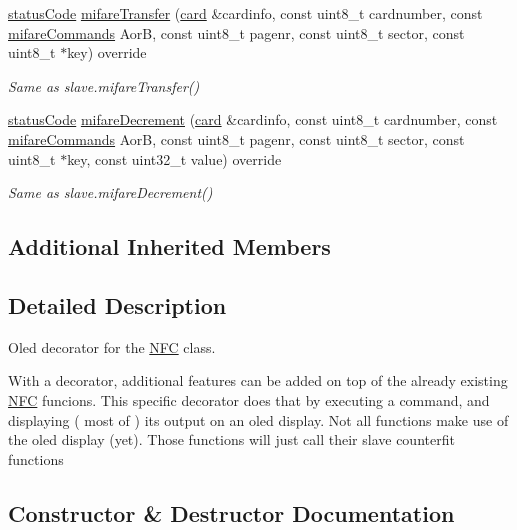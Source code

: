 \begin{DoxyCompactItemize}
\hyperlink{declarations_8h_ae1d20c5a38cae82ccaa6a77be3fd264b}{status\+Code} \hyperlink{classnfc_1_1NfcOled_ab0a2321b094ce75503cde8f6bb7a91ef}{mifare\+Transfer} (\hyperlink{classcard}{card} \&cardinfo, const uint8\+\_\+t cardnumber, const \hyperlink{declarations_8h_a305b1a3bcfca65e2a82f0f9d24676835}{mifare\+Commands} AorB, const uint8\+\_\+t pagenr, const uint8\+\_\+t sector, const uint8\+\_\+t $\ast$key) override
\begin{DoxyCompactList}\small\item\em Same as slave.\+mifare\+Transfer() \end{DoxyCompactList}\item 
\mbox{\label{classnfc_1_1NfcOled_af6fd65859104e507b4c8c5718bc86d22}} 
\hyperlink{declarations_8h_ae1d20c5a38cae82ccaa6a77be3fd264b}{status\+Code} \hyperlink{classnfc_1_1NfcOled_af6fd65859104e507b4c8c5718bc86d22}{mifare\+Decrement} (\hyperlink{classcard}{card} \&cardinfo, const uint8\+\_\+t cardnumber, const \hyperlink{declarations_8h_a305b1a3bcfca65e2a82f0f9d24676835}{mifare\+Commands} AorB, const uint8\+\_\+t pagenr, const uint8\+\_\+t sector, const uint8\+\_\+t $\ast$key, const uint32\+\_\+t value) override
\begin{DoxyCompactList}\small\item\em Same as slave.\+mifare\+Decrement() \end{DoxyCompactList}\end{DoxyCompactItemize}
\subsection*{Additional Inherited Members}


\subsection{Detailed Description}
Oled decorator for the \hyperlink{classnfc_1_1NFC}{N\+FC} class. 

With a decorator, additional features can be added on top of the already existing \hyperlink{classnfc_1_1NFC}{N\+FC} funcions. This specific decorator does that by executing a command, and displaying ( most of ) it\textquotesingle{}s output on an oled display. Not all functions make use of the oled display (yet). Those functions will just call their slave counterfit functions 

\subsection{Constructor \& Destructor Documentation}
\mbox{\label{classnfc_1_1NfcOled_ab3917823345cbb6bc0881fa04d84a6cb}} 
